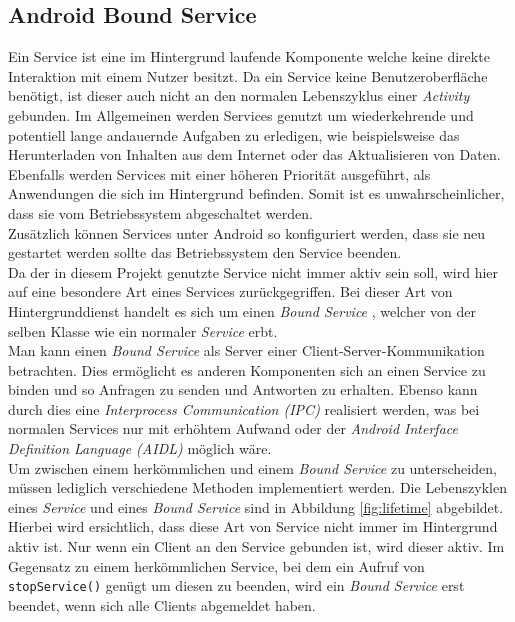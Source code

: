 \documentclass[]{report}
\begin{document}
\subsection{Android Bound Service}
Ein Service ist eine im Hintergrund laufende Komponente welche keine direkte Interaktion mit einem Nutzer besitzt. Da ein Service keine Benutzeroberfläche benötigt, ist dieser auch nicht an den normalen Lebenszyklus einer \textit{Activity} gebunden. Im Allgemeinen werden Services genutzt um wiederkehrende und potentiell lange andauernde Aufgaben zu erledigen, wie beispielsweise das Herunterladen von Inhalten aus dem Internet oder das Aktualisieren von Daten. Ebenfalls werden Services mit einer höheren Priorität ausgeführt, als Anwendungen die sich im Hintergrund befinden. Somit ist es unwahrscheinlicher, dass sie vom Betriebssystem abgeschaltet werden. \\
Zusätzlich können Services unter Android so konfiguriert werden, dass sie neu gestartet werden sollte das Betriebssystem den Service beenden. \\
Da der in diesem Projekt genutzte Service nicht immer aktiv sein soll, wird hier auf eine besondere Art eines Services zurückgegriffen. Bei dieser Art von Hintergrunddienst handelt es sich um einen \textit{Bound Service} \cite{BoundService}, welcher von der selben Klasse wie ein normaler \textit{Service} erbt. \\
Man kann einen \textit{Bound Service} als Server einer Client-Server-Kommunikation betrachten. Dies ermöglicht es anderen Komponenten sich an einen Service zu binden und so Anfragen zu senden und Antworten zu erhalten. Ebenso kann durch dies eine \textit{Interprocess Communication (IPC)} realisiert werden, was bei normalen Services nur mit erhöhtem Aufwand oder der \textit{Android Interface Definition Language (AIDL)} möglich wäre. \\
Um zwischen einem herkömmlichen und einem \textit{Bound Service} zu unterscheiden, müssen lediglich verschiedene Methoden implementiert werden. Die Lebenszyklen eines \textit{Service} und eines \textit{Bound Service} sind in Abbildung \ref{fig:lifetime} abgebildet. \\
Hierbei wird ersichtlich, dass diese Art von Service nicht immer im Hintergrund aktiv ist. Nur wenn ein Client an den Service gebunden ist, wird dieser aktiv. Im Gegensatz zu einem herkömmlichen Service, bei dem ein Aufruf von \texttt{stopService()} genügt um diesen zu beenden, wird ein \textit{Bound Service} erst beendet, wenn sich alle Clients abgemeldet haben.
\end{document}
